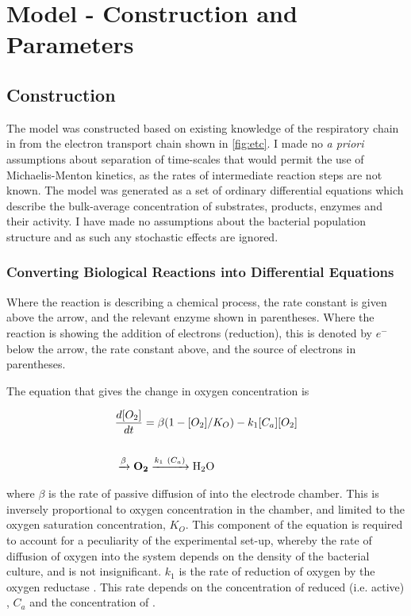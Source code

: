 \chapter{Model - Construction and Parameters}
\label{chap:model}
\section{Construction}

The model was constructed based on existing knowledge of the respiratory chain in \Nsm{} from the electron transport chain shown in \ref{fig:etc}. I made no \textit{a priori} assumptions about separation of time-scales that would permit the use of Michaelis-Menton kinetics, as the rates of intermediate reaction steps are not known.
The model was generated as a set of ordinary differential equations which describe the bulk-average concentration of substrates, products, enzymes and their activity. I have made no assumptions about the bacterial population structure and as such any stochastic effects are ignored.

\subsection{Converting Biological Reactions into Differential Equations}
Where the reaction is describing a chemical process, the rate constant is given above the arrow, and the relevant enzyme shown in parentheses. Where the reaction is showing the addition of electrons (reduction), this is denoted by $e^-$ below the arrow, the rate constant above, and the source of electrons in parentheses.

The equation that gives the change in oxygen concentration is

\begin{eqnarray}
&\frac{d[O_2]}{dt} = \beta(1-[O_2]/K_O) - k_{1}[C_a][O_2] \nonumber \\\nonumber \\
&\xrightarrow{\beta} \mathbf{O_2} \xrightarrow{k_1~(C_a)} \textnormal{H$_\textnormal{2}$O}
\label{eq:oxygen}
\end{eqnarray}

where $\beta$ is the rate of passive diffusion of \cOxygen{} into the electrode chamber. This is inversely proportional to oxygen concentration in the chamber, and limited to the oxygen saturation concentration, $K_O$. This component of the equation is required to account for a peculiarity of the experimental set-up, whereby the rate of diffusion of oxygen into the system depends on the density of the bacterial culture, and is not insignificant. $k_{1}$ is the rate of reduction of oxygen by the oxygen reductase \cbbthree{}. This rate depends on the concentration of reduced (i.e. active) \cbbthree{}, $C_a$ and the concentration of \cOxygen{}.

